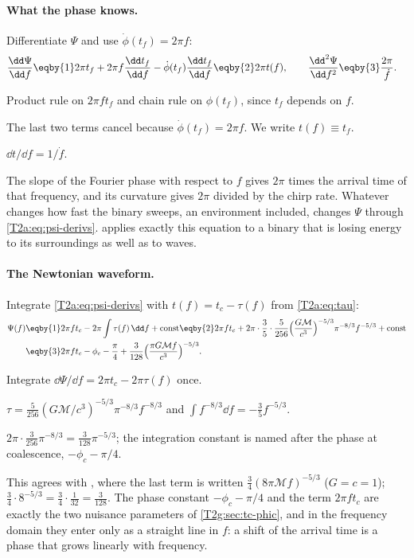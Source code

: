 \paragraph{What the phase knows.}
Differentiate $\Psi$ and use $\dot\phi(t_f)=2\pi f$:
\begin{align}
  \frac{\dd\Psi}{\dd f}
  &\eqby{1}2\pi t_f+2\pi f\frac{\dd t_f}{\dd f}-\dot\phi(t_f)\frac{\dd t_f}{\dd f}
  \eqby{2}2\pi t(f),\qquad
  \frac{\dd^2\Psi}{\dd f^2}\eqby{3}\frac{2\pi}{\dot f}.\label{T2a:eq:psi-derivs}
\end{align}
\begin{explain}
  \item Product rule on $2\pi ft_f$ and chain rule on $\phi(t_f)$, since $t_f$ depends on $f$.
  \item The last two terms cancel because $\dot\phi(t_f)=2\pi f$. We write $t(f)\equiv t_f$.
  \item $\dd t/\dd f=1/\dot f$.
\end{explain}
The slope of the Fourier phase with respect to $f$ gives $2\pi$ times the arrival time of that frequency, and its curvature gives $2\pi$ divided by the chirp rate. Whatever changes how fast the binary sweeps, an environment included, changes $\Psi$ through \eqref{T2a:eq:psi-derivs}.  applies exactly this equation to a binary that is losing energy to its surroundings as well as to waves.

\paragraph{The Newtonian waveform.}
Integrate \eqref{T2a:eq:psi-derivs} with $t(f)=t_c-\tau(f)$ from \eqref{T2a:eq:tau}:
\begin{align}
  \Psi(f)
  &\eqby{1}2\pi ft_c-2\pi\int\tau(f)\,\dd f+\text{const}
   \eqby{2}2\pi ft_c+2\pi\cdot\frac35\cdot\frac{5}{256}\Big(\frac{G\mathcal M}{c^3}\Big)^{-5/3}\pi^{-8/3}f^{-5/3}+\text{const}\nonumber\\
  &\eqby{3}2\pi ft_c-\phi_c-\frac\pi4+\frac{3}{128}\Big(\frac{\pi G\mathcal Mf}{c^3}\Big)^{-5/3}.\label{T2a:eq:psiN}
\end{align}
\begin{explain}
  \item Integrate $\dd\Psi/\dd f=2\pi t_c-2\pi\tau(f)$ once.
  \item $\tau=\tfrac{5}{256}(G\mathcal M/c^3)^{-5/3}\pi^{-8/3}f^{-8/3}$ and $\int f^{-8/3}\dd f=-\tfrac35f^{-5/3}$.
  \item $2\pi\cdot\tfrac{3}{256}\pi^{-8/3}=\tfrac{3}{128}\pi^{-5/3}$; the integration constant is named after the phase at coalescence, $-\phi_c-\pi/4$.
\end{explain}
This agrees with \cite[eq.~(24)]{CutlerFlanagan1994}, where the last term is written $\tfrac34(8\pi\mathcal Mf)^{-5/3}$ ($G=c=1$); $\tfrac34\cdot8^{-5/3}=\tfrac34\cdot\tfrac1{32}=\tfrac3{128}$. The phase constant $-\phi_c-\pi/4$ and the term $2\pi ft_c$ are exactly the two nuisance parameters of \cref{T2g:sec:tc-phic}, and in the frequency domain they enter only as a straight line in $f$: a shift of the arrival time is a phase that grows linearly with frequency.

